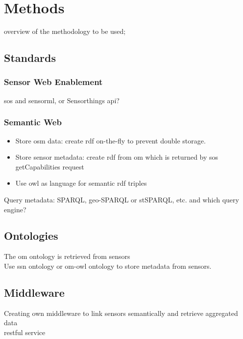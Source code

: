 \chapter{Methods}
\label{chap:methods}

overview of the methodology to be used;

\section{Standards}
\subsection{Sensor Web Enablement}
\ac{sos} and \ac{sensorml}, or Sensorthings \ac{api}? 

\subsection{Semantic Web}

\begin{itemize}
	\item Store \ac{osm} data: create \ac{rdf} on-the-fly to prevent double storage. 
	\item Store sensor metadata: create \ac{rdf} from \ac{om} which is returned by \ac{sos} getCapabilities request
	\item Use \ac{owl} as language for semantic \ac{rdf} triples
\end{itemize}


Query metadata: SPARQL, geo-SPARQL or stSPARQL, etc. and which query engine?

\section{Ontologies}
The \ac{om} ontology is retrieved from sensors\\
Use \ac{ssn} ontology or \ac{om}-\ac{owl} ontology to store metadata from sensors.  

\section{Middleware}
Creating own middleware to link sensors semantically and retrieve aggregated data\\

\ac{rest}ful service




